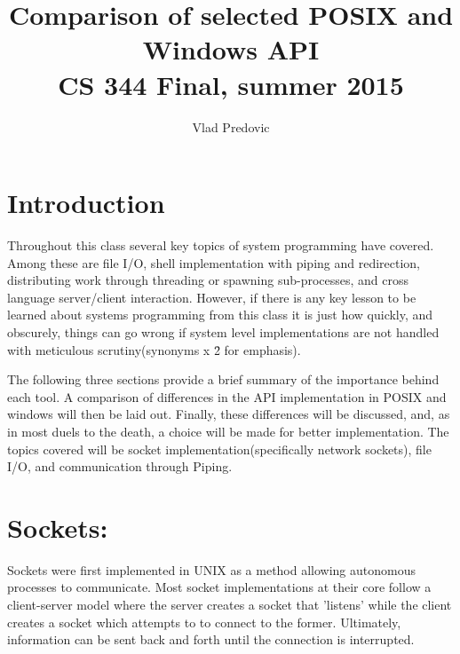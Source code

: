 \documentclass[letterpaper,10pt,titlepage]{article}
\begin{document}
\title{Comparison of selected POSIX and Windows API \\ CS 344 Final, summer 2015}
\author{Vlad Predovic}
\maketitle

\section{Introduction}
	Throughout this class several key topics of system programming have covered. Among these are file I/O, shell implementation with piping and redirection, 
distributing work through threading or spawning sub-processes, and cross language server/client interaction. However, 
if there is any key lesson to be learned about systems programming from this class it is just how quickly, and obscurely, 
things can go wrong if system level implementations are not handled with meticulous scrutiny(synonyms x \= 2  for emphasis).

	The following three sections provide a brief summary of the importance behind each tool. 
A comparison of differences in the API implementation in POSIX and windows will then be laid out.
Finally, these differences will be discussed, and, as in most duels to the death, a choice will be made for better implementation.
The topics covered will be socket implementation(specifically network sockets), file I/O, and communication through Piping.


\section{Sockets:}
	Sockets were first implemented in UNIX as a method allowing autonomous processes to communicate. Most socket implementations
at their core follow a client-server model where the server creates a socket that 'listens'
while the client creates a socket which attempts to to connect to the former. Ultimately, information can
be sent back and forth until the connection is interrupted.
\end{document}
